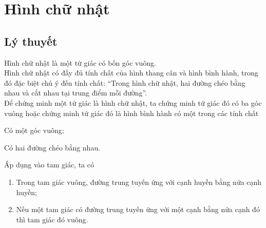 \section{Hình chữ nhật}
\subsection{Lý thuyết}
Hình chữ nhật là một tứ giác có bốn góc vuông.\\
Hình chữ nhật có đầy đủ tính chất của hình thang cân và hình bình hành, trong đó đặc biệt chú ý đến tính chất: ``Trong hình chữ nhật, hai đường chéo bằng nhau và cắt nhau tại trung điểm mỗi đường''.\\
Để chứng minh một tứ giác là hình chữ nhật, ta chứng minh tứ giác đó có ba góc vuông hoặc chứng minh tứ giác đó là hình bình hành có một trong các tính chất
\begin{enumEX}[1)]{2}
	\item Có một góc vuông;
	\item Có hai đường chéo bằng nhau.
\end{enumEX}
Áp dụng vào tam giác, ta có
\begin{enumerate}
	\item Trong tam giác vuông, đường trung tuyến ứng với cạnh huyền bằng nửa cạnh huyền;
	\item Nếu một tam giác có đường trung tuyến ứng với một cạnh bằng nửa cạnh đó thì tam giác đó vuông.
\end{enumerate}
